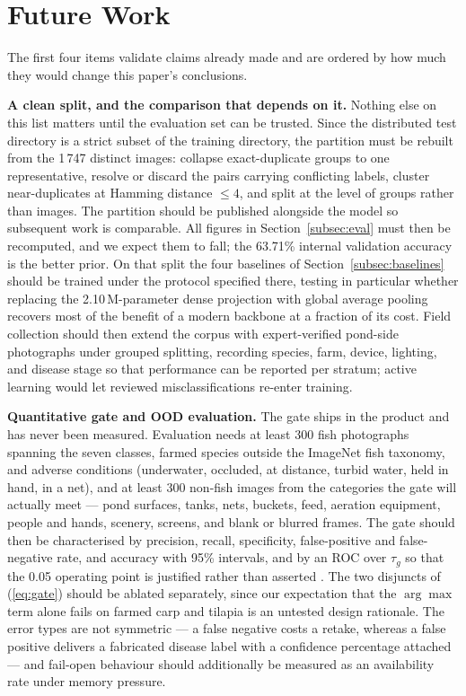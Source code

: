 \documentclass[conference]{IEEEtran}
\begin{document}
\section{Future Work}
\label{sec:future}

The first four items validate claims already made and are ordered by how much they would change this paper's conclusions.

\textbf{A clean split, and the comparison that depends on it.} Nothing else on this list matters until the evaluation set can be trusted. Since the distributed test directory is a strict subset of the training directory, the partition must be rebuilt from the 1\,747 distinct images: collapse exact-duplicate groups to one representative, resolve or discard the pairs carrying conflicting labels, cluster near-duplicates at Hamming distance $\leq4$, and split at the level of groups rather than images. The partition should be published alongside the model so subsequent work is comparable. All figures in Section~\ref{subsec:eval} must then be recomputed, and we expect them to fall; the 63.71\% internal validation accuracy is the better prior. On that split the four baselines of Section~\ref{subsec:baselines} should be trained under the protocol specified there, testing in particular whether replacing the 2.10\,M-parameter dense projection with global average pooling recovers most of the benefit of a modern backbone at a fraction of its cost. Field collection should then extend the corpus with expert-verified pond-side photographs under grouped splitting, recording species, farm, device, lighting, and disease stage so that performance can be reported per stratum; active learning \cite{b32} would let reviewed misclassifications re-enter training.

\textbf{Quantitative gate and OOD evaluation.} The gate ships in the product and has never been measured. Evaluation needs at least 300 fish photographs spanning the seven classes, farmed species outside the ImageNet fish taxonomy, and adverse conditions (underwater, occluded, at distance, turbid water, held in hand, in a net), and at least 300 non-fish images from the categories the gate will actually meet --- pond surfaces, tanks, nets, buckets, feed, aeration equipment, people and hands, scenery, screens, and blank or blurred frames. The gate should then be characterised by precision, recall, specificity, false-positive and false-negative rate, and accuracy with 95\% intervals, and by an ROC over $\tau_g$ so that the 0.05 operating point is justified rather than asserted \cite{b25}. The two disjuncts of (\ref{eq:gate}) should be ablated separately, since our expectation that the $\arg\max$ term alone fails on farmed carp and tilapia is an untested design rationale. The error types are not symmetric --- a false negative costs a retake, whereas a false positive delivers a fabricated disease label with a confidence percentage attached --- and fail-open behaviour should additionally be measured as an availability rate under memory pressure.
\end{document}
